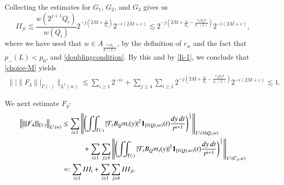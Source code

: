 \documentclass[11pt, a4paper,leqno]{amsart}
\newcommand{\mm}{\mathfrak{m}}
\renewcommand{\chi}{{\bf 1}}
\theoremstyle{plain}
\theoremstyle{definition}
\theoremstyle{remark}
\numberwithin{equation}{section}
\def \iint{\int\!\!\!\int}
\begin{document}
Collecting the estimates for $G_1$, $G_2$, and $G_3$ gives us
$$
II_{ji}\lesssim \frac{w(2^{j+1}Q_i)}{w(Q_i)}2^{-j\left(2M+\frac{n}{p_0}\right)}
2^{-i(2M+\varepsilon)}
\lesssim
2^{-j\left(2M+\frac{n}{p_0}-\frac{r_wp_0n}{p_-(L)}\right)}
2^{-i(2M+\varepsilon)},
$$
where we have used that $w\in A_{\frac{r_wp_0}{p_-(L)}}$, by the definition of $r_w$ and the fact that $p_-(L)<p_0$, and \eqref{doublingcondition}.
By this and by \eqref{Ii-1}, we conclude that \eqref{choice-M} yields
\begin{align}\label{acotacionmoleculasF3}
 \big\||\|F_3\||_{\Gamma(\cdot)}\big\|_{L^1(w)}\lesssim \sum_{i\geq 1}2^{-i\varepsilon}+\sum_{j\geq 4}\sum_{i\geq 1}2^{-j\left(2M+\frac{n}{p_0}-\frac{r_wp_0n}{p_-(L)}\right)}
2^{-i(2M+\varepsilon)}\lesssim 1.
 \end{align}

We next estimate $F_4$:
\begin{align*}
\big\||\|F_4\||_{\Gamma(\cdot)}\big\|_{L^1(w)}
&\leq
\sum_{i\geq 1} \left\|\left(\iint_{\Gamma(\cdot)}|\mathcal{T}_tB_Q\mm_i(y)|^2\chi_{[\ell(Q),\infty)}(t)\frac{dy\,dt}{t^{n+1}}\right)^{\frac{1}{2}}\right\|_{L^1(16Q_i,w)}
\\
&\qquad\quad+
\sum_{i\geq 1}\sum_{j\geq 4} \left\|\left(\iint_{\Gamma(\cdot)}|\mathcal{T}_tB_Q\mm_i(y)|^2\chi_{[\ell(Q),\infty)}(t)\frac{dy\,dt}{t^{n+1}}\right)^{\frac{1}{2}}\right\|_{L^1(C_{ji},w)}
\\
&=:
\sum_{i\geq 1}III_i
+
\sum_{i\geq 1}\sum_{j\geq 4}III_{ji}.
\end{align*}
\end{document}
